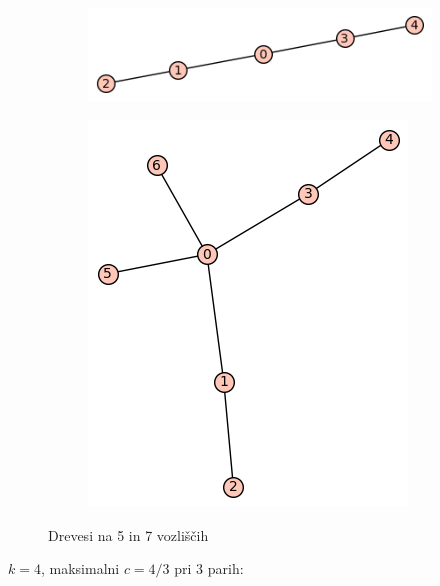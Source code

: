 \documentclass[12pt, a4paper]{article}
\begin{document}
\begin{center}
\begin{center}
\begin{figure}[!htb]
\centering
\begin{subfigure}{0.5\textwidth}
  \centering
  \includegraphics[width=0.4\linewidth]{t-5}
\end{subfigure}%
\begin{subfigure}{0.5\textwidth}
  \centering
  \includegraphics[width=0.5\linewidth]{t-22}
\end{subfigure}
\caption{Drevesi na 5 in 7 vozliščih}
\label{fig:test}
\end{figure}
\end{center}


$k=4$, maksimalni $c=4/3$ pri 3 parih:\\


\end{center}
\end{document}
